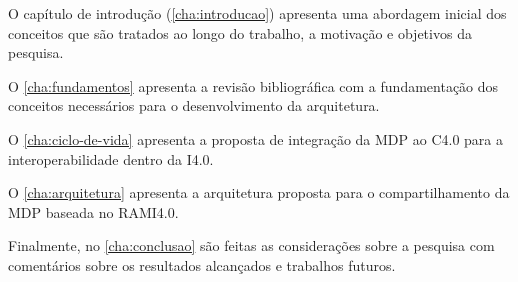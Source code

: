 O capítulo de introdução (\autoref{cha:introducao}) apresenta uma abordagem inicial dos conceitos que são tratados ao longo do trabalho, a motivação e objetivos da pesquisa.

O \autoref{cha:fundamentos} apresenta a revisão bibliográfica com a fundamentação dos conceitos necessários para o desenvolvimento da arquitetura.

O \autoref{cha:ciclo-de-vida} apresenta a proposta de integração da MDP ao C4.0 para a interoperabilidade dentro da I4.0.

O \autoref{cha:arquitetura} apresenta a arquitetura proposta para o compartilhamento da MDP baseada no RAMI4.0.

Finalmente, no \autoref{cha:conclusao} são feitas as considerações sobre a pesquisa com comentários sobre os resultados alcançados e trabalhos futuros.
